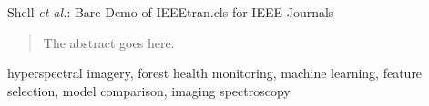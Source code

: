 \documentclass[letterpaper, peerreview]{IEEEtran}
\begin{document}
%
{Shell \MakeLowercase{\textit{et al.}}: Bare Demo of IEEEtran.cls for IEEE Journals}
%

\maketitle

\begin{abstract}
	The abstract goes here.
\end{abstract}

\begin{IEEEkeywords}
	hyperspectral imagery, forest health monitoring, machine learning, feature selection, model comparison, imaging spectroscopy
\end{IEEEkeywords}

\ifCLASSOPTIONpeerreview{}
\fi

\IEEEpeerreviewmaketitle{}
\end{document}
